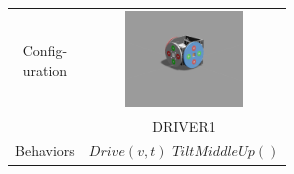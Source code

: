 \documentclass{standalone}
\newcommand{\picHeight}{1in}
\begin{document}
        \begin{tabular}{| c | c |}
            \hline
            \pbox{20cm}{Config-\\uration} &
            \includegraphics[height=\picHeight]{driver1.png} \\
            ~ & DRIVER1 \\ \hline
            Behaviors &
            \pbox{20cm}{\(Drive(v,t)\) \\ \(TiltMiddleUp()\)} \\ \hline
        \end{tabular}
\end{document}
